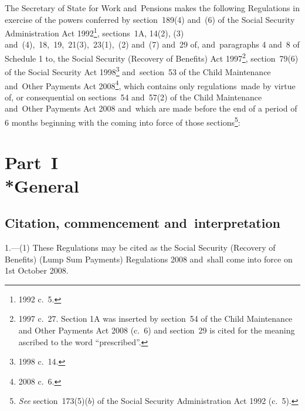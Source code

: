 \documentclass[12pt,a4paper]{article}
\title{\regstitle}
\author{S.I.\ 2008 No.\ 1596}
\date{Made
18th June 2008\\
Laid before Parliament
25th June 2008\\
Coming into~force
1st October 2008
}
\begin{document}
\maketitle

\begin{sloppypar}
\noindent
The Secretary of State for Work and~Pensions makes the following Regulations in exercise of the powers conferred by section~189(4) and~(6) of the Social Security Administration Act 1992\footnote{1992 c.~5.}, sections~1A, 14(2), (3) and~(4),~18,~19,~21(3),~23(1),~(2) and~(7) and~29 of, and~paragraphs 4 and~8 of Schedule 1 to, the Social Security (Recovery of Benefits) Act 1997\footnote{1997 c.~27. Section 1A was inserted by section~54 of the Child Maintenance and Other Payments Act 2008 (c.~6) and section~29 is cited for the meaning ascribed to the word “prescribed”.}, section~79(6) of the Social Security Act 1998\footnote{1998 c.~14.} and~section~53 of the Child Maintenance and~Other Payments Act 2008\footnote{2008 c.~6.}, which contains only regulations~made by virtue of, or consequential on sections~54 and~57(2) of the Child Maintenance and~Other Payments Act 2008 and~which are made before the end of a period of 6 months beginning with the coming into force of those sections\footnote{\emph{See} section~173(5)($b$)  of the Social Security Administration Act 1992 (c.~5).}: 
\end{sloppypar}

{\sloppy

\tableofcontents

}

\bigskip

\setcounter{secnumdepth}{-2}

\section[Part~I --- General]{Part~I\\*General}

\renewcommand\parthead{--- Part~I}

\subsection[1. Citation, commencement and~interpretation]{Citation, commencement and~interpretation}

1.---(1)  These Regulations may be cited as the Social Security (Recovery of Benefits) (Lump Sum Payments) Regulations 2008 and~shall come into force on 1st October 2008.
\end{document}
